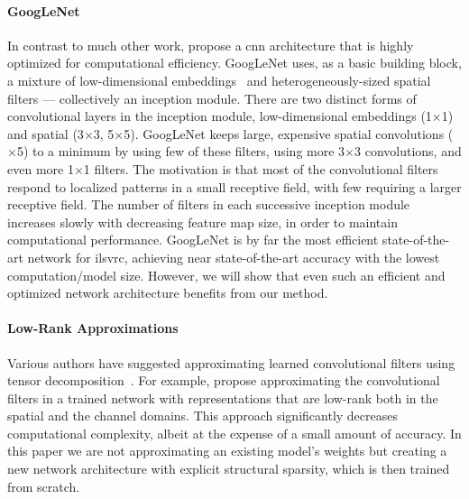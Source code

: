 \documentclass[thesis]{subfiles}
\begin{document}
	\paragraph{GoogLeNet} In contrast to much other work, \citet{Szegedy2014going} propose a \gls{cnn} architecture that is highly optimized for computational efficiency. GoogLeNet uses, as a basic building block, a mixture of low-dimensional embeddings~\citep{Lin2013NiN} and heterogeneously-sized spatial filters --- collectively an \Gls{inception} module. 
	There are two distinct forms of convolutional layers in the \gls{inception} module, low-dimensional embeddings (1$\times$1) and spatial (3$\times$3, 5$\times $5). GoogLeNet keeps large, expensive spatial convolutions ($\times$5) to a minimum by using few of these filters, using more 3$\times$3 convolutions, and even more 1$\times$1 filters. The motivation is that most of the convolutional filters respond to localized patterns in a small receptive field, with few requiring a larger receptive field. The number of filters in each successive \gls{inception} module increases slowly with decreasing feature map size, in order to maintain computational performance. GoogLeNet is by far the most efficient state-of-the-art network for \gls{ilsvrc}, achieving near state-of-the-art accuracy with the lowest computation/model size. However, we will show that even such an efficient and optimized network architecture benefits from our method.
	
	\paragraph{Low-Rank Approximations}
	Various authors have suggested approximating learned convolutional filters using tensor decomposition~\citep{journals/corr/JaderbergVZ14,journals/corr/LebedevGROL14,Kim2016}. For example, \citet{journals/corr/JaderbergVZ14} propose approximating the convolutional filters in a trained network with representations that are low-rank both in the spatial and the channel domains. This approach significantly decreases computational complexity, albeit at the expense of a small amount of accuracy. In this paper we are not approximating an existing model's weights but creating a new network architecture with explicit structural sparsity, which is then trained from scratch.
	
\end{document}
